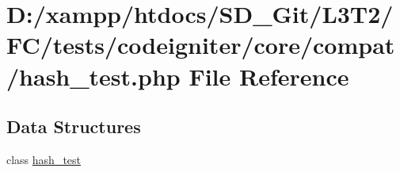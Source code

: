 \hypertarget{tests_2codeigniter_2core_2compat_2hash__test_8php}{}\section{D\+:/xampp/htdocs/\+S\+D\+\_\+\+Git/\+L3\+T2/\+F\+C/tests/codeigniter/core/compat/hash\+\_\+test.php File Reference}
\label{tests_2codeigniter_2core_2compat_2hash__test_8php}
\subsection*{Data Structures}
\begin{DoxyCompactItemize}
\item 
class \hyperlink{classhash__test}{hash\+\_\+test}
\end{DoxyCompactItemize}
